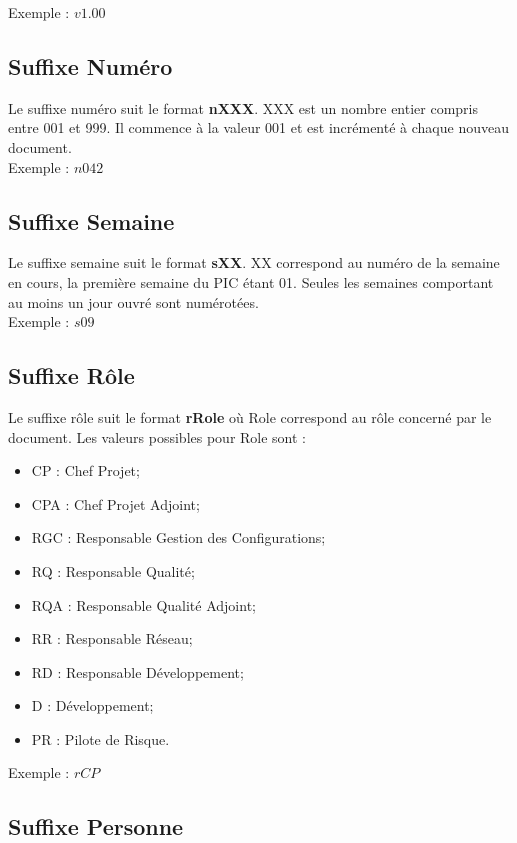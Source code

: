 Exemple : $v1.00$

\subsection{Suffixe Numéro}
\label{suffixe_numero}

Le suffixe numéro suit le format \textbf{nXXX}. XXX est un nombre entier compris entre 001 et 999. Il commence à la valeur 001 et est incrémenté à chaque nouveau document.\\

Exemple : $n042$

\subsection{Suffixe Semaine}
\label{suffixe_semaine}

Le suffixe semaine suit le format \textbf{sXX}. XX correspond au numéro de la semaine en cours, la première semaine du PIC étant 01. Seules les semaines comportant au moins un jour ouvré sont numérotées.\\

Exemple : $s09$

\subsection{Suffixe Rôle}
\label{suffixe_role}

Le suffixe rôle suit le format \textbf{rRole} où Role correspond au rôle concerné par le document. Les valeurs possibles pour Role sont : 
\begin{itemize}
\item CP : Chef Projet;
\item CPA : Chef Projet Adjoint;
\item RGC : Responsable Gestion des Configurations;
\item RQ : Responsable Qualité;
\item RQA : Responsable Qualité Adjoint;
\item RR : Responsable Réseau;
\item RD : Responsable Développement;
\item D : Développement;
\item PR : Pilote de Risque.\\
\end{itemize}

Exemple : $rCP$

\subsection{Suffixe Personne}
\label{suffixe_personne}


